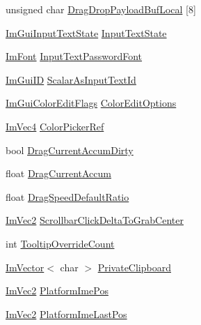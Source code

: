 \begin{DoxyCompactItemize}
\item 
unsigned char \mbox{\hyperlink{struct_im_gui_context_ae4f0ffccf3107a3eb4e1ba3d6258c3e4}{Drag\+Drop\+Payload\+Buf\+Local}} \mbox{[}8\mbox{]}
\item 
\mbox{\hyperlink{struct_im_gui_input_text_state}{Im\+Gui\+Input\+Text\+State}} \mbox{\hyperlink{struct_im_gui_context_ab6f5d3daaa248a26bdbcb098d73640c1}{Input\+Text\+State}}
\item 
\mbox{\hyperlink{struct_im_font}{Im\+Font}} \mbox{\hyperlink{struct_im_gui_context_a6aa67b9b778bd741d9866ec34cc8ee8b}{Input\+Text\+Password\+Font}}
\item 
\mbox{\hyperlink{imgui_8h_a1785c9b6f4e16406764a85f32582236f}{Im\+Gui\+ID}} \mbox{\hyperlink{struct_im_gui_context_af7d6712f53762d620c4d4dac89dbc222}{Scalar\+As\+Input\+Text\+Id}}
\item 
\mbox{\hyperlink{imgui_8h_a6b2d5e95adc38f22c021252189f669c6}{Im\+Gui\+Color\+Edit\+Flags}} \mbox{\hyperlink{struct_im_gui_context_a122394766b40cdb6cbd8a40fbe6ac680}{Color\+Edit\+Options}}
\item 
\mbox{\hyperlink{struct_im_vec4}{Im\+Vec4}} \mbox{\hyperlink{struct_im_gui_context_ae3a119a9a71b31ede7ccc87447627b68}{Color\+Picker\+Ref}}
\item 
bool \mbox{\hyperlink{struct_im_gui_context_a2a465bca097a53eba66b613d01765636}{Drag\+Current\+Accum\+Dirty}}
\item 
float \mbox{\hyperlink{struct_im_gui_context_a524267e65a0b5c3c96a2b629902b4db2}{Drag\+Current\+Accum}}
\item 
float \mbox{\hyperlink{struct_im_gui_context_aea2d961c03a1d0879088385d8cf602dd}{Drag\+Speed\+Default\+Ratio}}
\item 
\mbox{\hyperlink{struct_im_vec2}{Im\+Vec2}} \mbox{\hyperlink{struct_im_gui_context_a07456ba31300e2ee1cb1827dfbd02fe6}{Scrollbar\+Click\+Delta\+To\+Grab\+Center}}
\item 
int \mbox{\hyperlink{struct_im_gui_context_a1c6e3c1b866fa1abf473d3cd9eafce0f}{Tooltip\+Override\+Count}}
\item 
\mbox{\hyperlink{class_im_vector}{Im\+Vector}}$<$ char $>$ \mbox{\hyperlink{struct_im_gui_context_a4ba950183c7c5e401ca4113e09b1ced4}{Private\+Clipboard}}
\item 
\mbox{\hyperlink{struct_im_vec2}{Im\+Vec2}} \mbox{\hyperlink{struct_im_gui_context_ae4f302f7b3f8f3705a0b5a823817554a}{Platform\+Ime\+Pos}}
\item 
\mbox{\hyperlink{struct_im_vec2}{Im\+Vec2}} \mbox{\hyperlink{struct_im_gui_context_aa07a9810576b2ff576d5f5a3f121ce3f}{Platform\+Ime\+Last\+Pos}}

\end{DoxyCompactItemize}
